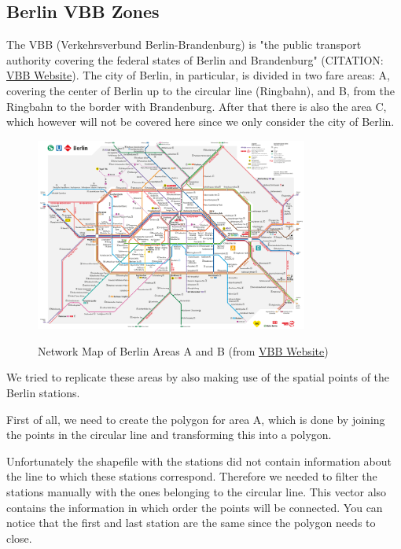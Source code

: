 \subsection{Berlin VBB Zones}\label{subsec:vbb}

The VBB (Verkehrsverbund Berlin-Brandenburg) is "the public transport authority covering the federal states of Berlin and Brandenburg" (CITATION: \href{https://www.vbb.de/en/about-us/the-company-vbb}{VBB Website}). The city of Berlin, in particular, is divided in two fare areas: A, covering the center of Berlin up to the circular line (Ringbahn), and B, from the Ringbahn to the border with Brandenburg. After that there is also the area C, which however will not be covered here since we only consider the city of Berlin.

\begin{figure}[H]
\begin{center}
\includegraphics[width=0.8\textwidth, keepaspectratio]{S_und_U-Bahnnetz_mit_Regionalbahn_Innenstadt.pdf} \\
\caption{Network Map of Berlin Areas A and B (from \href{https://www.vbb.de/en/timetables/network-maps}{VBB Website})}
\end{center}
\end{figure}

We tried to replicate these areas by also making use of the spatial points of the Berlin stations.

First of all, we need to create the polygon for area A, which is done by joining the points in the circular line and transforming this into a polygon.

Unfortunately the shapefile with the stations did not contain information about the line to which these stations correspond. Therefore we needed to filter the stations manually with the ones belonging to the circular line. This vector also contains the information in which order the points will be connected. You can notice that the first and last station are the same since the polygon needs to close.

